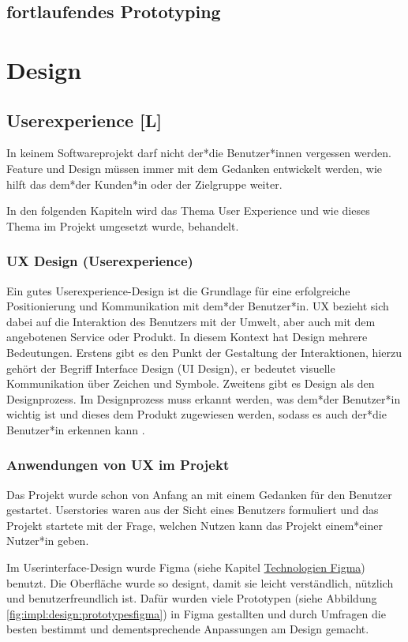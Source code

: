 \subsection{fortlaufendes Prototyping}
\label{ch::ongoing-prototyping}

\section{Design}
\subsection{Userexperience [L]}
In keinem Softwareprojekt darf nicht der*die Benutzer*innen vergessen werden. Feature und Design müssen immer mit dem Gedanken entwickelt werden, wie hilft das dem*der Kunden*in oder der Zielgruppe weiter.

In den folgenden Kapiteln wird das Thema User Experience und wie dieses Thema im Projekt umgesetzt wurde, behandelt.
\subsubsection{UX Design (Userexperience)}
Ein gutes Userexperience-Design ist die Grundlage für eine erfolgreiche Positionierung und Kommunikation mit dem*der Benutzer*in.
UX bezieht sich dabei auf die Interaktion des Benutzers mit der Umwelt, aber auch mit dem angebotenen Service oder Produkt. In diesem Kontext hat Design mehrere Bedeutungen.
Erstens gibt es den Punkt der Gestaltung der Interaktionen, hierzu gehört der Begriff Interface Design (UI Design), er bedeutet visuelle Kommunikation über Zeichen und Symbole.
Zweitens gibt es Design als den Designprozess. Im Designprozess muss erkannt werden, was dem*der Benutzer*in wichtig ist und dieses dem Produkt zugewiesen werden, sodass es auch der*die Benutzer*in erkennen kann \cite{UserExperienceDesign}.

\subsubsection{Anwendungen von UX im Projekt}
Das Projekt wurde schon von Anfang an mit einem Gedanken für den Benutzer gestartet. Userstories waren aus der Sicht eines Benutzers formuliert und das Projekt startete mit der Frage, welchen Nutzen kann das Projekt einem*einer Nutzer*in geben.

Im Userinterface-Design wurde Figma (siehe Kapitel \hyperref[ch::technologies::figma]{Technologien Figma}) benutzt. Die Oberfläche wurde so designt, damit sie leicht verständlich, nützlich und benutzerfreundlich ist. Dafür wurden viele Prototypen (siehe Abbildung \ref{fig:impl:design:prototypesfigma}) in Figma gestallten und durch Umfragen die besten bestimmt und dementsprechende Anpassungen am Design gemacht.

